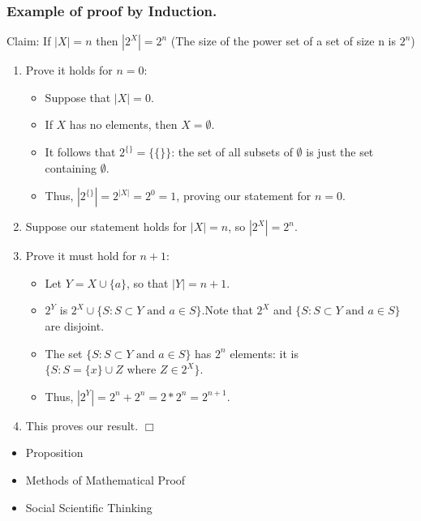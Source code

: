 \documentclass[aspectratio=169, handout]{beamer}
\numberwithin{equation}{section}
\begin{document}
\begin{frame}
\frametitle{Example of proof by Induction.}

Claim:  If $|X|=n$ then $|2^X|=2^n$ (The size of the power set of a set of size n is $2^n$)\\
\begin{enumerate}
\item Prove it holds for $n=0$: 
\begin{itemize}
\item Suppose that $|X|=0$.  
\item If $X$ has no elements, then $X=\emptyset$. 
\item It follows that  $2^{\{\}}=\{\{\}\}$: the set of all subsets of $\emptyset$ is just the set containing $\emptyset$.  
\item Thus, $|2^{\{\}}|=2^{|X|}=2^0=1$, proving our statement for $n=0$.
\end{itemize}

\item Suppose our statement holds for $|X|=n$, so $|2^X|=2^n$.  

\item Prove it must hold for $n+1$: 
\begin{itemize}
\item Let $Y=X\cup \{a\}$, so that $|Y|=n+1$.  
\item $2^Y$ is $2^X\cup\{S: S\subset Y \text{ and } a\in S\}$.\pause   Note that $2^X$ and $\{S: S\subset Y \text{ and } a\in S\}$ are disjoint. \pause

\item The set $\{S: S\subset Y \text{ and } a\in S\}$ has $2^n$ elements: it is $\{S:  S=\{x\}\cup Z \text{ where } Z\in 2^X\}$.  \pause
\item Thus, $|2^Y| = 2^n+2^n=2*2^n=2^{n+1}$. \pause

\end{itemize}
\item This proves our result. $\Box$
\end{enumerate}
\end{frame}

\begin{frame}

\begin{itemize}
\item \textcolor{mygray}{Proposition}
\item \textcolor{mygray}{Methods of Mathematical Proof}
\item \textcolor{myblack}{Social Scientific Thinking}
\end{itemize}

\end{frame}
\end{document}

